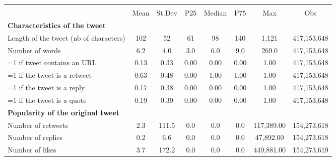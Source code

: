 {
\def\sym#1{\ifmmode^{#1}\else\(^{#1}\)\fi}
\begin{tabular}{l*{1}{ccccccc}}
\hline\hline
                    &\multicolumn{7}{c}{}                                                                      \\
                    &        Mean&      St.Dev&         P25&      Median&         P75&         Max&         Obs\\
\hline
\textbf{Characteristics of the tweet}&            &            &            &            &            &            &            \\
Length of the tweet (nb of characters)&         102&          52&          61&          98&         140&       1,121& 417,153,648\\
Number of words     &         6.2&         4.0&         3.0&         6.0&         9.0&       269.0& 417,153,648\\
=1 if tweet contains an URL&        0.13&        0.33&        0.00&        0.00&        0.00&        1.00& 417,153,648\\
=1 if the tweet is a retweet&        0.63&        0.48&        0.00&        1.00&        1.00&        1.00& 417,153,648\\
=1 if the tweet is a reply&        0.17&        0.38&        0.00&        0.00&        0.00&        1.00& 417,153,648\\
=1 if the tweet is a quote&        0.19&        0.39&        0.00&        0.00&        0.00&        1.00& 417,153,648\\
\textbf{Popularity of the original tweet}&            &            &            &            &            &            &            \\
Number of retweets  &         2.3&       111.5&         0.0&         0.0&         0.0&  117,389.00& 154,273,618\\
Number of replies   &         0.2&         6.6&         0.0&         0.0&         0.0&   47,892.00& 154,273,618\\
Number of likes     &         3.7&       172.2&         0.0&         0.0&         0.0&  449,881.00& 154,273,619\\
\hline\hline
\end{tabular}
}
